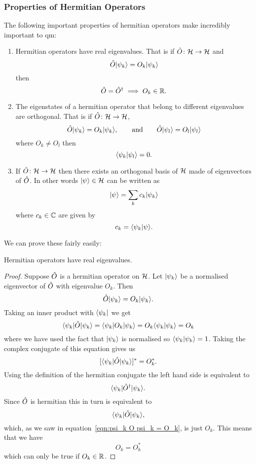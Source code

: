     \subsubsection{Properties of Hermitian Operators}
    The following important properties of hermitian operators make incredibly important to \acrshort{qm}:
    \begin{enumerate}
        \item Hermitian operators have real eigenvalues.
        That is if \(\hat{O}\colon\mathcal{H}\to\mathcal{H}\) and
        \[\hat{O}\vert {\psi_k} \rangle = O_k\vert {\psi_k} \rangle\]
        then
        \[\hat{O} = \hat{O}^\dagger \implies O_k\in\mathbb{R}.\]
        
        \item The eigenstates of a hermitian operator that belong to different eigenvalues are orthogonal.
        That is if \(\hat{O}\colon\mathcal{H}\to\mathcal{H}\),
        \[\hat{O}\vert {\psi_k} \rangle = O_k\vert {\psi_k} \rangle, \qquad\text{and}\qquad \hat{O}\vert {\psi_l} \rangle = O_l\vert {\psi_l} \rangle\]
        where \(O_k \ne O_l\) then
        \[\langle {\psi_k} \vert {\psi_l} \rangle = 0.\]
        
        \item If \(\hat{O}\colon\mathcal{H}\to\mathcal{H}\) then there exists an orthogonal basis of \(\mathcal{H}\) made of eigenvectors of \(\hat{O}\).
        In other words \(\vert {\psi} \rangle\in\mathcal{H}\) can be written as
        \[\vert {\psi} \rangle = \sum_k c_k\vert {\psi_k} \rangle\]
        where \(c_k\in\mathbb{C}\) are given by
        \[c_k = \langle {\psi_k} \vert {\psi} \rangle.\]
    \end{enumerate}
    We can prove these fairly easily:
    \begin{theorem}{}{}
        Hermitian operators have real eigenvalues.
    \end{theorem}
    \begin{proof}
        Suppose \(\hat{O}\) is a hermitian operator on \(\mathcal{H}\).
        Let \(\vert {\psi_k} \rangle\) be a normalised eigenvector of \(\hat{O}\) with eigenvalue \(O_k\).
        Then
        \[\hat{O}\vert {\psi_k} \rangle = O_k\vert {\psi_k} \rangle.\]
        Taking an inner product with \(\langle {\psi_k} \vert\) we get
        \begin{equation}\label{eqn:psi_k O psi_k = O_k}
            \langle {\psi_k} \vert\hat{O}\vert {\psi_k} \rangle = \langle {\psi_k} \vert O_k\vert {\psi_k} \rangle = O_k\langle {\psi_k} \vert {\psi_k} \rangle = O_k
        \end{equation}
        where we have used the fact that \(\vert {\psi_k} \rangle\) is normalised so \(\langle {\psi_k} \vert {\psi_k} \rangle = 1\).
        Taking the complex conjugate of this equation gives us
        \[[\langle {\psi_k} \vert\hat{O}\vert {\psi_k} \rangle]^* = O_k^*.\]
        Using the definition of the hermitian conjugate the left hand side is equivalent to
        \[\langle {\psi_k} \vert\hat{O}^\dagger\vert {\psi_k} \rangle.\]
        Since \(\hat{O}\) is hermitian this in turn is equivalent to
        \[\langle {\psi_k} \vert\hat{O}\vert {\psi_k} \rangle,\]
        which, as we saw in equation~\ref{eqn:psi_k O psi_k = O_k}, is just \(O_k\).
        This means that we have
        \[O_k = O_k^*\]
        which can only be true if \(O_k\in\mathbb{R}\).
    \end{proof}
